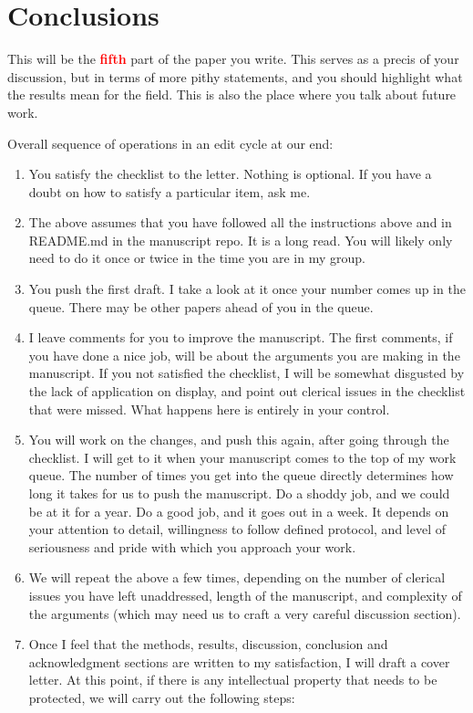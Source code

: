 \documentclass[12 pt]{article}
\begin{document}
\section{Conclusions}
\label{sec:conclusions}

This will be the \textbf{\Huge \textcolor{red}{fifth}} part of the paper you write. This serves as a precis of your discussion, but in terms of more pithy statements, and you should highlight what the results mean for the field. This is also the place where you talk about future work.

Overall sequence of operations in an edit cycle at our end:

\begin{enumerate}
\item You satisfy the checklist to the letter. Nothing is optional. If you have a doubt on how to satisfy a particular item, ask me.
\item The above assumes that you have followed all the instructions above and in README.md in the manuscript repo. It is a long read. You will likely only need to do it once or twice in the time you are in my group.
\item You push the first draft. I take a look at it once your number comes up in the queue. There may be other papers ahead of you in the queue.
\item I leave comments for you to improve the manuscript. The first comments, if you have done a nice job, will be about the arguments you are making in the manuscript. If you not satisfied the checklist, I will be somewhat disgusted by the lack of application on display, and point out clerical issues in the checklist that were missed. What happens here is entirely in your control.
\item You will work on the changes, and push this again, after going through the checklist. I will get to it when your manuscript comes to the top of my work queue. The number of times you get into the queue directly determines how long it takes for us to push the manuscript. Do a shoddy job, and we could be at it for a year. Do a good job, and it goes out in a week. It depends on your attention to detail, willingness to follow defined protocol, and level of seriousness and pride with which you approach your work.
\item We will repeat the above a few times, depending on the number of clerical issues you have left unaddressed, length of the manuscript, and complexity of the arguments (which may need us to craft a very careful discussion section).
\item Once I feel that the methods, results, discussion, conclusion and acknowledgment sections are written to my satisfaction, I will draft a cover letter. At this point, if there is any intellectual property that needs to be protected, we will carry out the following steps:


\end{enumerate}
\end{document}
